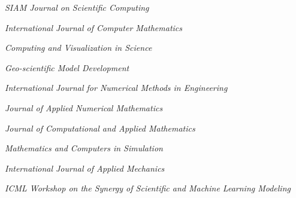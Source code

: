 \documentclass[11pt,letterpaper]{report}
\newcommand{\listitemspace}{0.25em}
\renewenvironment{itemize}
{\begin{list}{}{\setlength{\leftmargin}{0em}
                \setlength{\parskip}{0em}
                \setlength{\itemsep}{\listitemspace}
                \setlength{\parsep}{\listitemspace}}}
{\end{list}}
\begin{document}
    \begin{itemize}
        \item \textit{SIAM Journal on Scientific Computing  }
        \item \textit{International Journal of Computer Mathematics }
        \item \textit{Computing and Visualization in Science}
        \item \textit{Geo-scientific Model Development }
        \item \textit{International Journal for Numerical Methods in Engineering }
        \item \textit{Journal of Applied Numerical Mathematics }
        \item \textit{Journal of Computational and Applied Mathematics }
        \item{\textit{Mathematics and Computers in Simulation}}
        \item \textit{International Journal of Applied Mechanics }
        \item \textit{ICML Workshop on the Synergy of Scientific and Machine Learning Modeling }
    \end{itemize}
        








\end{document}
